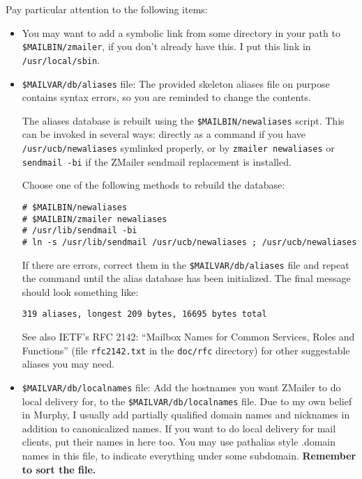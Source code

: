 Pay particular attention to the following items:
\begin{itemize}
\item You may want to add a symbolic link from some directory in your path
to {\tt \$MAILBIN/zmailer}, if you don't already have this.  I put this link
in {\tt /usr/local/sbin}.
\item {\tt \$MAILVAR/db/aliases} file:  The provided skeleton aliases file on purpose contains syntax errors,
so you are reminded to change the contents.

The aliases database is rebuilt using the {\tt \$MAILBIN/newaliases} script.
This can be invoked in several ways: directly as a command if you
have {\tt /usr/ucb/newaliases} symlinked properly, or by {\tt zmailer newaliases}
or {\tt sendmail -bi} if the ZMailer sendmail replacement is installed.

Choose one of the following methods to rebuild the database:
\begin{tscreen}
\begin{verbatim}
# $MAILBIN/newaliases
# $MAILBIN/zmailer newaliases
# /usr/lib/sendmail -bi
# ln -s /usr/lib/sendmail /usr/ucb/newaliases ; /usr/ucb/newaliases
\end{verbatim}
\end{tscreen}

If there are errors, correct them in the {\tt \$MAILVAR/db/aliases} file
and repeat the command until the alias database has been initialized.
The final message should look something like:
\begin{tscreen}
\begin{verbatim}
319 aliases, longest 209 bytes, 16695 bytes total
\end{verbatim}
\end{tscreen}

See also IETF's RFC 2142: ``Mailbox Names for Common Services, Roles and
Functions'' (file {\tt rfc2142.txt} in the {\tt doc/rfc} directory) 
for other suggestable aliases you may need. 
                                                               
\item {\tt \$MAILVAR/db/localnames} file: Add the hostnames you want ZMailer to do local delivery for, to the
{\tt \$MAILVAR/db/localnames} file.  Due to my own belief in Murphy,
I usually add partially qualified domain names and nicknames in
addition to canonicalized names.  If you want to do local delivery
for mail clients, put their names in here too.  You may use pathalias 
style .domain names in this file, to indicate everything under some
subdomain. {\bf Remember to sort the file.}


\end{itemize}
